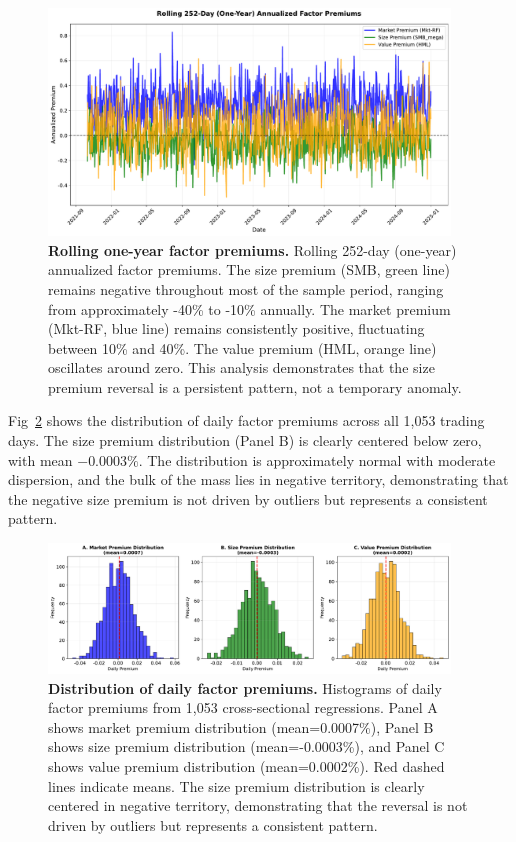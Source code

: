 \documentclass[10pt,letterpaper]{article}
\begin{document}
\begin{figure}[!h]
\centering
\includegraphics[width=0.95\textwidth]{figures/fig3_rolling_window.pdf}
\caption{\textbf{Rolling one-year factor premiums.}
Rolling 252-day (one-year) annualized factor premiums. The size premium (SMB, green line) remains negative throughout most of the sample period, ranging from approximately -40\% to -10\% annually. The market premium (Mkt-RF, blue line) remains consistently positive, fluctuating between 10\% and 40\%. The value premium (HML, orange line) oscillates around zero. This analysis demonstrates that the size premium reversal is a persistent pattern, not a temporary anomaly.}
\label{fig:rolling}
\end{figure}

Fig~\ref{fig:premium_dist} shows the distribution of daily factor premiums across all 1,053 trading days. The size premium distribution (Panel B) is clearly centered below zero, with mean $-0.0003\%$. The distribution is approximately normal with moderate dispersion, and the bulk of the mass lies in negative territory, demonstrating that the negative size premium is not driven by outliers but represents a consistent pattern.

\begin{figure}[!h]
\centering
\includegraphics[width=0.95\textwidth]{figures/fig6_premium_distributions.pdf}
\caption{\textbf{Distribution of daily factor premiums.}
Histograms of daily factor premiums from 1,053 cross-sectional regressions. Panel A shows market premium distribution (mean=0.0007\%), Panel B shows size premium distribution (mean=-0.0003\%), and Panel C shows value premium distribution (mean=0.0002\%). Red dashed lines indicate means. The size premium distribution is clearly centered in negative territory, demonstrating that the reversal is not driven by outliers but represents a consistent pattern.}
\label{fig:premium_dist}
\end{figure}
\end{document}
